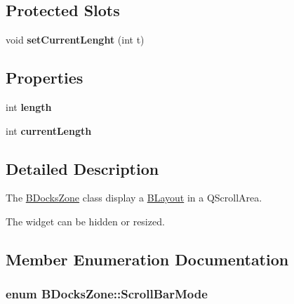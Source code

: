 \subsection*{\-Protected \-Slots}
\begin{DoxyCompactItemize}
\item 
\hypertarget{class_b_docks_zone_ade5e2f8579546a8355b5c75befe842f5}{void {\bfseries set\-Current\-Lenght} (int t)}\label{class_b_docks_zone_ade5e2f8579546a8355b5c75befe842f5}

\end{DoxyCompactItemize}
\subsection*{\-Properties}
\begin{DoxyCompactItemize}
\item 
\hypertarget{class_b_docks_zone_a26430cbbe5912630ebeb2ff92163e659}{int {\bfseries length}}\label{class_b_docks_zone_a26430cbbe5912630ebeb2ff92163e659}

\item 
\hypertarget{class_b_docks_zone_a3ba97d259ca964bebff21ff657038e29}{int {\bfseries current\-Length}}\label{class_b_docks_zone_a3ba97d259ca964bebff21ff657038e29}

\end{DoxyCompactItemize}


\subsection{\-Detailed \-Description}
\-The \hyperlink{class_b_docks_zone}{\-B\-Docks\-Zone} class display a \hyperlink{class_b_layout}{\-B\-Layout} in a \-Q\-Scroll\-Area. 

\-The widget can be hidden or resized. 

\subsection{\-Member \-Enumeration \-Documentation}
\hypertarget{class_b_docks_zone_aaa04c632b39dce77b61a3a28b7418fdd}{
\subsubsection[{\-Scroll\-Bar\-Mode}]{\setlength{\rightskip}{0pt plus 5cm}enum {\bf \-B\-Docks\-Zone\-::\-Scroll\-Bar\-Mode}}}\label{class_b_docks_zone_aaa04c632b39dce77b61a3a28b7418fdd}


